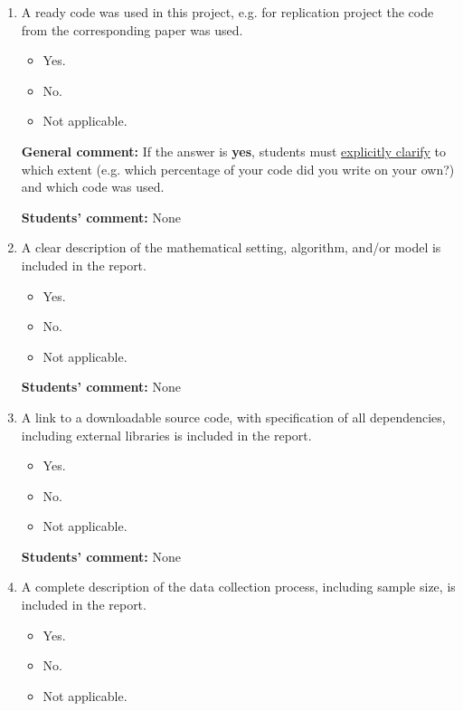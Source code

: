 \documentclass{article}
\begin{document}
\begin{enumerate}
  \item A ready code was used in this project, e.g. for replication project the code from the corresponding paper was used.
    \begin{itemize}
      \item [\faCheckSquareO] Yes.
      \item [\faSquareO] No.
      \item [\faSquareO] Not applicable.
    \end{itemize}

    \textbf{General comment:} If the answer is \textbf{yes}, students must \underline{explicitly clarify} to which extent (e.g. which percentage of your code did you write on your own?) and which code was used.

    \textbf{Students' comment:} None
  \item A clear description of the mathematical setting, algorithm, and/or model is included in the report.
    \begin{itemize}
      \item [\faSquareO] Yes.
      \item [\faSquareO] No.
      \item [\faSquareO] Not applicable.
    \end{itemize}

    \textbf{Students' comment:} None

  \item A link to a downloadable source code, with specification of all dependencies, including external libraries is included in the report.
    \begin{itemize}
      \item [\faSquareO] Yes.
      \item [\faSquareO] No.
      \item [\faSquareO] Not applicable.
    \end{itemize}

    \textbf{Students' comment:} None

  \item A complete description of the data collection process, including sample size, is included in the report.
    \begin{itemize}
      \item [\faSquareO] Yes.
      \item [\faSquareO] No.
      \item [\faSquareO] Not applicable.
    \end{itemize}


\end{enumerate}
\end{document}
